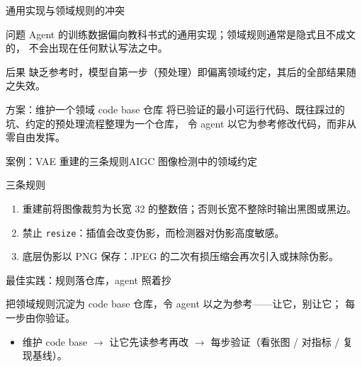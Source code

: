 \documentclass[aspectratio=169]{beamer}
\begin{document}
\begin{frame}{通用实现与领域规则的冲突}
  \begin{block}{问题}
    Agent 的训练数据偏向教科书式的通用实现；领域规则通常是隐式且不成文的，
    不会出现在任何默认写法之中。
  \end{block}
  \begin{alertblock}{后果}
    缺乏参考时，模型自第一步（预处理）即偏离领域约定，其后的全部结果随之失效。
  \end{alertblock}
  \begin{block}{方案：维护一个领域 code base 仓库}
    将已验证的最小可运行代码、既往踩过的坑、约定的预处理流程整理为一个仓库，
    令 agent 以它为参考修改代码，而非从零自由发挥。
  \end{block}
\end{frame}

\begin{frame}{案例：VAE 重建的三条规则}{AIGC 图像检测中的领域约定}
  \begin{center}
  \end{center}
  \begin{block}{三条规则}
    \begin{enumerate}
      \item 重建前将图像裁剪为长宽 32 的整数倍；否则长宽不整除时输出黑图或黑边。
      \item 禁止 \texttt{resize}：插值会改变伪影，而检测器对伪影高度敏感。
      \item 底层伪影以 PNG 保存：JPEG 的二次有损压缩会再次引入或抹除伪影。
    \end{enumerate}
  \end{block}
\end{frame}

\begin{frame}{\textcolor{video}{最佳实践}：规则落仓库，agent 照着抄}
  \begin{exampleblock}{}
    把领域规则沉淀为 code base 仓库，令 agent 以之为参考——让它，别让它；
    每一步由你验证。
  \end{exampleblock}
  \bigskip
  \begin{itemize}
    \item 维护 code base $\to$ 让它先读参考再改 $\to$ 每步验证（看张图 / 对指标 / 复现基线）。
  \end{itemize}
\end{frame}
\end{document}
